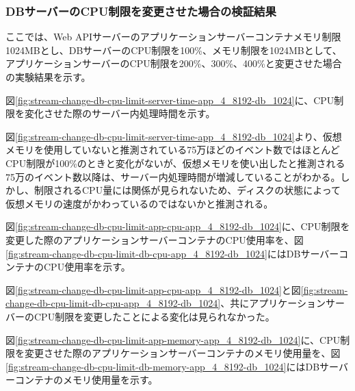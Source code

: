 \documentclass[../../../../main]{subfiles}
\begin{document}
    \subsubsection{DBサーバーのCPU制限を変更させた場合の検証結果}\label{subsubsec:result-streaming-change-db-cpu}

    ここでは、Web APIサーバーのアプリケーションサーバーコンテナメモリ制限1024MBとし、DBサーバーのCPU制限を100\%、メモリ制限を1024MBとして、アプリケーションサーバーのCPU制限を200\%、300\%、400\%と変更させた場合の実験結果を示す。


    図\ref{fig:stream-change-db-cpu-limit-server-time-app_4_8192-db_1024}に、CPU制限を変化させた際のサーバー内処理時間を示す。

    

    図\ref{fig:stream-change-db-cpu-limit-server-time-app_4_8192-db_1024}より、仮想メモリを使用していないと推測されている75万ほどのイベント数ではほとんどCPU制限が100\%のときと変化がないが、仮想メモリを使い出したと推測される75万のイベント数以降は、サーバー内処理時間が増減していることがわかる。しかし、制限されるCPU量には関係が見られないため、ディスクの状態によって仮想メモリの速度がかわっているのではないかと推測される。


    図\ref{fig:stream-change-db-cpu-limit-app-cpu-app_4_8192-db_1024}に、CPU制限を変更した際のアプリケーションサーバーコンテナのCPU使用率を、図\ref{fig:stream-change-db-cpu-limit-db-cpu-app_4_8192-db_1024}にはDBサーバーコンテナのCPU使用率を示す。

    

    

    図\ref{fig:stream-change-db-cpu-limit-app-cpu-app_4_8192-db_1024}と図\ref{fig:stream-change-db-cpu-limit-db-cpu-app_4_8192-db_1024}、共にアプリケーションサーバーのCPU制限を変更したことによる変化は見られなかった。


    図\ref{fig:stream-change-db-cpu-limit-app-memory-app_4_8192-db_1024}に、CPU制限を変更させた際のアプリケーションサーバーコンテナのメモリ使用量を、図\ref{fig:stream-change-db-cpu-limit-db-memory-app_4_8192-db_1024}にはDBサーバーコンテナのメモリ使用量を示す。

    
\end{document}
